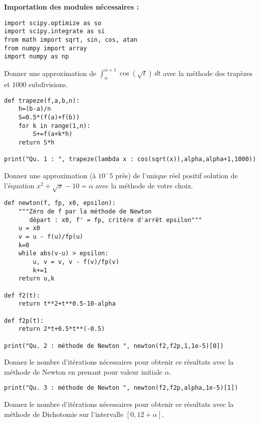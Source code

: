 \textbf{Importation des modules nécessaires : }

\begin{lstlisting}
import scipy.optimize as so
import scipy.integrate as si
from math import sqrt, sin, cos, atan
from numpy import array
import numpy as np
\end{lstlisting}



\question{} Donner une approximation de $\int_{\alpha}^{\alpha+1} \cos(\sqrt{t})\,dt$ avec la méthode des trapèzes et 1000 subdivisions.

\begin{lstlisting}
def trapeze(f,a,b,n):
    h=(b-a)/n
    S=0.5*(f(a)+f(b))
    for k in range(1,n):
        S+=f(a+k*h)
    return S*h
    
print("Qu. 1 : ", trapeze(lambda x : cos(sqrt(x)),alpha,alpha+1,1000))
\end{lstlisting}


\question{}  Donnez une approximation (à $10^-5$ près) de l'unique réel positif solution de
  l'équation $x^{2}+\sqrt{x}-10 = \alpha$ avec la méthode de votre choix.
  
  
  
\begin{lstlisting}
def newton(f, fp, x0, epsilon):
    """Zéro de f par la méthode de Newton
       départ : x0, f' = fp, critère d'arrêt epsilon"""
    u = x0
    v = u - f(u)/fp(u)
    k=0
    while abs(v-u) > epsilon:
        u, v = v, v - f(v)/fp(v)
        k+=1
    return u,k

def f2(t):
    return t**2+t**0.5-10-alpha

def f2p(t):
    return 2*t+0.5*t**(-0.5)
    
print("Qu. 2 : méthode de Newton ", newton(f2,f2p,1,1e-5)[0])
\end{lstlisting}
  
\question{}
  Donnez le nombre d'itérations nécessaires pour obtenir ce résultats avec la méthode de Newton en prenant pour valeur initiale $\alpha$.
  
\begin{lstlisting}
print("Qu. 3 : méthode de Newton ", newton(f2,f2p,alpha,1e-5)[1])
\end{lstlisting}
  
  
  
\question{}
  Donnez le nombre d'itérations nécessaires pour obtenir ce résultats avec la méthode de Dichotomie sur l'intervalle $\left[0,12+\alpha\right]$.

